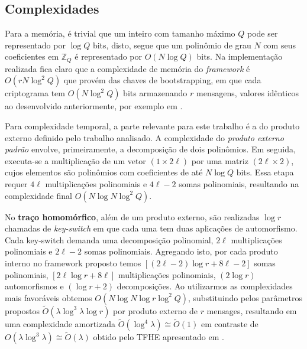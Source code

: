\subsection{Complexidades}
Para a memória, é trivial que um inteiro com tamanho máximo $Q$ pode ser representado por $\log Q$ bits, disto, segue que um  polinômio de grau $N$ com seus coeficientes em $\mathbb{Z}_Q$ é representado por $O(N \log Q)$ bits. Na implementação realizada fica claro que a complexidade de memória do \emph{framework} é $O(r N \log^2 Q)$ que provém das chaves de bootstrapping, em que cada criptograma tem $O(N \log^2Q)$ bits armazenando $r$ mensagens, valores idênticos ao desenvolvido anteriormente, por exemplo em \cite{Guimaraes2023Amortized}. 

Para complexidade temporal, a parte relevante para este trabalho é a do produto externo definido pelo trabalho analisado. A complexidade do \textit{produto externo padrão} envolve, primeiramente, a decomposição de dois polinômios. Em seguida, executa-se a multiplicação de um vetor $(1 \times 2\ell)$ por uma matriz $(2\ell \times 2)$, cujos elementos são polinômios com coeficientes de até $N \log Q$ bits. Essa etapa requer $4\ell$ multiplicações polinomiais e $4\ell - 2$ somas polinomiais, resultando na complexidade final $O(N \log N \log^2 Q)$.
 
No \textbf{traço homomórfico}, além de um produto externo, são realizadas $\log r$ chamadas de \textit{key-switch} em que cada uma tem duas aplicações de automorfismo. Cada key-switch demanda uma decomposição polinomial, $2\ell$ multiplicações polinomiais e $2\ell-2$ somas polinomiais. Agregando isto, por cada produto interno no framework proposto temos $[(2\ell-2) \log r + 8\ell - 2]$ somas polinomiais, $[2\ell \log r + 8\ell]$ multiplicações polinomiais, $(2 \log r)$ automorfismos e $(\log r + 2)$ decomposições. Ao utilizarmos as complexidades mais favoráveis obtemos $O(N \log N \log r \log^2 Q )$, substituindo pelos parâmetros propostos $\tilde{O}(\lambda \log ^3 \lambda \log r)$ por produto externo de $r$ mensages, resultando em uma complexidade amortizada $\tilde{O}(\log ^4 \lambda) \cong \tilde{O}(1)$ em contraste de $O(\lambda \log^3 \lambda) \cong \tilde{O}(\lambda)$ obtido pelo TFHE apresentado em \cite{Guimaraes2023Amortized}.

